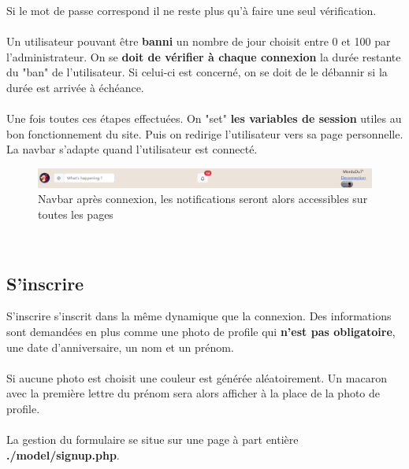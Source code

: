 \documentclass{article}
\begin{document}
Si le mot de passe correspond il ne reste plus qu'à faire une seul vérification.\\\\
Un utilisateur pouvant être \textbf{banni} un nombre de jour choisit entre 0 et 100 par l'administrateur. On se \textbf{doit de vérifier à chaque connexion} la durée restante du "ban" de l'utilisateur. Si celui-ci est concerné, on se doit de le débannir si la durée est arrivée à échéance.\\\\
Une fois toutes ces étapes effectuées. On "set" \textbf{les variables de session} utiles au bon fonctionnement du site. Puis on redirige l'utilisateur vers sa page personnelle. La navbar s'adapte quand l'utilisateur est connecté.
\begin{figure}[!t]\centering
\includegraphics[width=\textwidth]{navbarA}
\caption{Navbar après connexion, les notifications seront alors accessibles sur toutes les pages}
\end{figure}\\
\subsection{S'inscrire}
S'inscrire s'inscrit dans la même dynamique que la connexion. Des informations sont demandées en plus comme une photo de profile qui \textbf{n'est pas obligatoire}, une date d'anniversaire, un nom et un prénom.\\\\
Si aucune photo est choisit une couleur est générée aléatoirement. Un macaron avec la première lettre du prénom sera alors afficher à la place de la photo de profile.\\\\
La gestion du formulaire se situe sur une page à part entière \textbf{./model/signup.php}.
\end{document}
